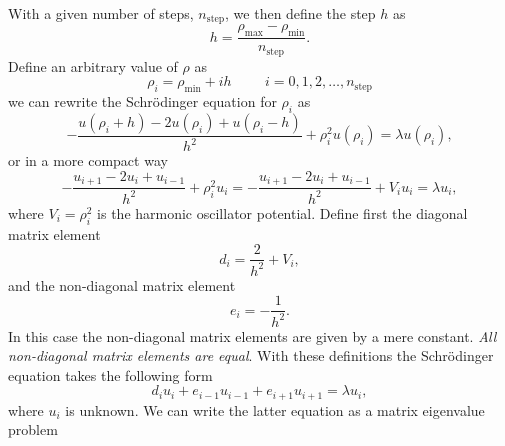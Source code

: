\documentclass[11pt,a4wide]{article}
\begin{document}
With a given number of steps, $n_{\mathrm{step}}$, we then 
define the step $h$ as
\[
  h=\frac{\rho_{\mathrm{max}}-\rho_{\mathrm{min}} }{n_{\mathrm{step}}}.
\]
Define an arbitrary value of $\rho$ as 
\[
    \rho_i= \rho_{\mathrm{min}} + ih \hspace{1cm} i=0,1,2,\dots , n_{\mathrm{step}}
\]
we can rewrite the Schr\"odinger equation for $\rho_i$ as
\[
-\frac{u(\rho_i+h) -2u(\rho_i) +u(\rho_i-h)}{h^2}+\rho_i^2u(\rho_i)  = \lambda u(\rho_i),
\]
or in  a more compact way
\[
-\frac{u_{i+1} -2u_i +u_{i-1}}{h^2}+\rho_i^2u_i=-\frac{u_{i+1} -2u_i +u_{i-1} }{h^2}+V_iu_i  = \lambda u_i,
\]
where $V_i=\rho_i^2$ is the harmonic oscillator potential.
Define first the diagonal matrix element
\[
   d_i=\frac{2}{h^2}+V_i,
\]
and the non-diagonal matrix element 
\[
   e_i=-\frac{1}{h^2}.
\]
In this case the non-diagonal matrix elements are given by a mere constant.
{\em All non-diagonal matrix elements are equal}.
With these definitions the Schr\"odinger equation takes the following form
\[
d_iu_i+e_{i-1}u_{i-1}+e_{i+1}u_{i+1}  = \lambda u_i,
\]
where $u_i$ is unknown. We can write the 
latter equation as a matrix eigenvalue problem 
\end{document}
